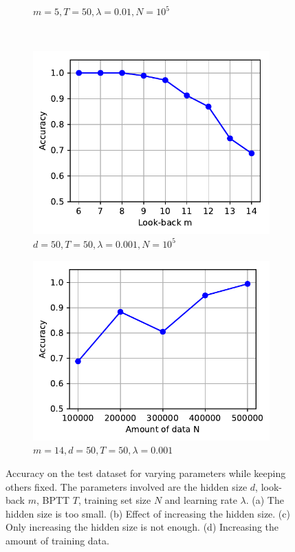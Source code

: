\begin{figure}[tb]
\begin{subfigure}[b]{0.5\linewidth}
				\caption{
					$m = 5, T = 50, \lambda = 0.01, N = 10^5$
					\label{fig:accuracy-vs-hidden-size}
				}
			\end{subfigure}
			\\
			\begin{subfigure}[b]{0.5\linewidth}
				\includegraphics[width=\linewidth]{Images/Python-Plots/memory/accuracy-vs-look-back2}
				\caption{
					$d = 50, T = 50, \lambda = 0.001, N = 10^5$
					\label{fig:accuracy-vs-look-back2}
				}
			\end{subfigure}%
			\begin{subfigure}[b]{0.5\linewidth}
				\includegraphics[width=\linewidth]{Images/Python-Plots/memory/more-training-data}
				\caption{
					$m = 14, d = 50, T = 50, \lambda = 0.001$
					\label{fig:more-training-data}
				}
			\end{subfigure}
			\caption[Memorizing the past with the LSTM: Binary digits]
			{Accuracy on the test dataset for varying parameters while keeping others fixed. 
				The parameters involved are the hidden size $d$, look-back $m$, BPTT $T$, training set size $N$ and learning rate $\lambda$. 
				(a) The hidden size is too small.
				(b) Effect of increasing the hidden size.
				(c) Only increasing the hidden size is not enough.
				(d) Increasing the amount of training data.}
			\label{fig:ablation-study-binary-memory}
		\end{figure}
